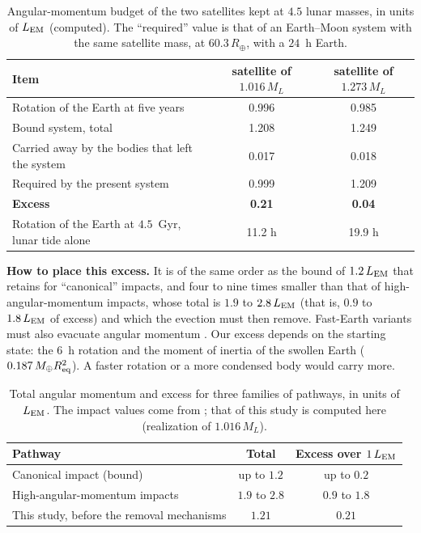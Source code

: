 \documentclass[11pt,a4paper]{article}
\newcommand{\Rt}{\ensuremath{R_\oplus}}
\newcommand{\Mt}{\ensuremath{M_\oplus}}
\newcommand{\ML}{\ensuremath{M_L}}
\newcommand{\LEM}{\ensuremath{L_{\rm EM}}}
\newcommand{\Req}{\ensuremath{R_{\rm eq}}}
\begin{document}
\begin{table}[htbp]
\centering
\caption{Angular-momentum budget of the two satellites kept at $4.5$ lunar masses, in units of $\LEM$ (computed). The ``required'' value is that of an Earth--Moon system with the same satellite mass, at $60.3\,\Rt$, with a $24$~h Earth.\label{tab:AM45}}
\small
\begin{tabular}{lcc}
\toprule
Item & satellite of $1.016\,\ML$ & satellite of $1.273\,\ML$ \\
\midrule
Rotation of the Earth at five years & 0.996 & 0.985 \\
Bound system, total & 1.208 & 1.249 \\
Carried away by the bodies that left the system & 0.017 & 0.018 \\
Required by the present system & 0.999 & 1.209 \\
\textbf{Excess} & \textbf{0.21} & \textbf{0.04} \\
Rotation of the Earth at $4.5$~Gyr, lunar tide alone & 11.2 h & 19.9 h \\
\bottomrule
\end{tabular}
\end{table}

\textbf{How to place this excess.} It is of the same order as the bound of $1.2\,\LEM$ that \citet{Canup2014} retains for ``canonical'' impacts, and four to nine times smaller than that of high-angular-momentum impacts, whose total is $1.9$ to $2.8\,\LEM$ (that is, $0.9$ to $1.8\,\LEM$ of excess) and which the evection must then remove. Fast-Earth variants must also evacuate angular momentum \citep{CukStewart2012,Tremaine2009}. Our excess depends on the starting state: the $6$~h rotation and the moment of inertia of the swollen Earth ($0.187\,\Mt\Req^2$). A faster rotation or a more condensed body would carry more.

\begin{table}[htbp]
\centering
\caption{Total angular momentum and excess for three families of pathways, in units of $\LEM$. The impact values come from \citet{Canup2014}; that of this study is computed here (realization of $1.016\,\ML$).\label{tab:compAM}}
\small
\begin{tabular}{lcc}
\toprule
Pathway & Total & Excess over $1\,\LEM$ \\
\midrule
Canonical impact (bound) & up to $1.2$ & up to $0.2$ \\
High-angular-momentum impacts & $1.9$ to $2.8$ & $0.9$ to $1.8$ \\
This study, before the removal mechanisms & $1.21$ & $0.21$ \\
\bottomrule
\end{tabular}
\end{table}
\end{document}
